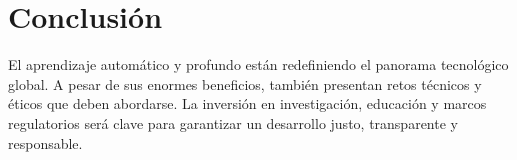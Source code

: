 \documentclass[12pt]{article}
\begin{document}
\section*{Conclusi\'on}
El aprendizaje autom\'atico y profundo est\'an redefiniendo el panorama tecnol\'ogico global. A pesar de sus enormes beneficios, tambi\'en presentan retos t\'ecnicos y \'eticos que deben abordarse. La inversi\'on en investigaci\'on, educaci\'on y marcos regulatorios ser\'a clave para garantizar un desarrollo justo, transparente y responsable.
\end{document}
